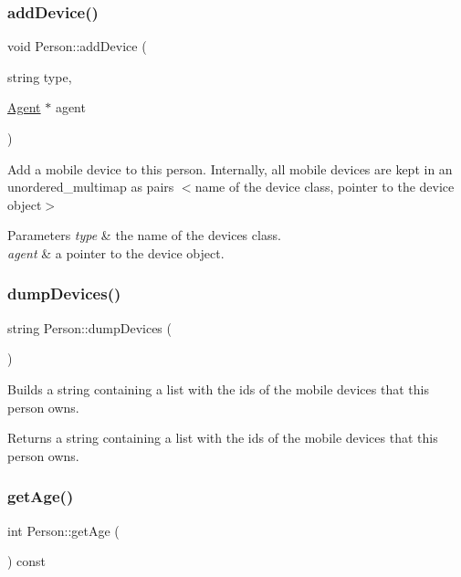 \subsubsection{\texorpdfstring{add\+Device()}{addDevice()}}
{\footnotesize\ttfamily void Person\+::add\+Device (\begin{DoxyParamCaption}\item[{string}]{type,  }\item[{\hyperlink{class_agent}{Agent} $\ast$}]{agent }\end{DoxyParamCaption})}

Add a mobile device to this person. Internally, all mobile devices are kept in an unordered\+\_\+multimap as pairs $<$name of the device class, pointer to the device object$>$ 
\begin{DoxyParams}{Parameters}
{\em type} & the name of the device\textquotesingle{}s class. \\
\hline
{\em agent} & a pointer to the device object. \\
\hline
\end{DoxyParams}
\mbox{\label{class_person_a0bc06f77b3e8a151f8c5cc77459895c9}} 
\subsubsection{\texorpdfstring{dump\+Devices()}{dumpDevices()}}
{\footnotesize\ttfamily string Person\+::dump\+Devices (\begin{DoxyParamCaption}{ }\end{DoxyParamCaption})}

Builds a string containing a list with the ids of the mobile devices that this person owns. \begin{DoxyReturn}{Returns}
a string containing a list with the ids of the mobile devices that this person owns. 
\end{DoxyReturn}
\mbox{\label{class_person_a4b66dbee570398920b8fb6aacddd2559}} 
\subsubsection{\texorpdfstring{get\+Age()}{getAge()}}
{\footnotesize\ttfamily int Person\+::get\+Age (\begin{DoxyParamCaption}{ }\end{DoxyParamCaption}) const}

